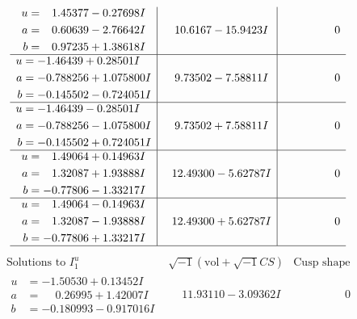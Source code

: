 \documentclass[1p]{elsarticle_modified}
\theoremstyle{definition}
\newcommand{\I}{\sqrt{-1}}
\begin{document}
$$\begin{array}{c|c|c}
\begin{aligned}
u &= \phantom{-}1.45377 - 0.27698 I \\
a &= \phantom{-}0.60639 - 2.76642 I \\
b &= \phantom{-}0.97235 + 1.38618 I\end{aligned}
 & \phantom{-}10.6167 - 15.9423 I & \phantom{-0.000000 } 0 \\ \hline\begin{aligned}
u &= -1.46439 + 0.28501 I \\
a &= -0.788256 + 1.075800 I \\
b &= -0.145502 - 0.724051 I\end{aligned}
 & \phantom{-}9.73502 - 7.58811 I & \phantom{-0.000000 } 0 \\ \hline\begin{aligned}
u &= -1.46439 - 0.28501 I \\
a &= -0.788256 - 1.075800 I \\
b &= -0.145502 + 0.724051 I\end{aligned}
 & \phantom{-}9.73502 + 7.58811 I & \phantom{-0.000000 } 0 \\ \hline\begin{aligned}
u &= \phantom{-}1.49064 + 0.14963 I \\
a &= \phantom{-}1.32087 + 1.93888 I \\
b &= -0.77806 - 1.33217 I\end{aligned}
 & \phantom{-}12.49300 - 5.62787 I & \phantom{-0.000000 } 0 \\ \hline\begin{aligned}
u &= \phantom{-}1.49064 - 0.14963 I \\
a &= \phantom{-}1.32087 - 1.93888 I \\
b &= -0.77806 + 1.33217 I\end{aligned}
 & \phantom{-}12.49300 + 5.62787 I & \phantom{-0.000000 } 0\\
 \hline 
 \end{array}$$\newpage$$\begin{array}{c|c|c}  
\text{Solutions to }I^u_{1}& \I (\text{vol} + \sqrt{-1}CS) & \text{Cusp shape}\\
 \hline 
\begin{aligned}
u &= -1.50530 + 0.13452 I \\
a &= \phantom{-}0.26995 + 1.42007 I \\
b &= -0.180993 - 0.917016 I\end{aligned}
 & \phantom{-}11.93110 - 3.09362 I & \phantom{-0.000000 } 0 \\ \hline\begin{aligned}

\end{aligned}
\end{array}$$
\end{document}
